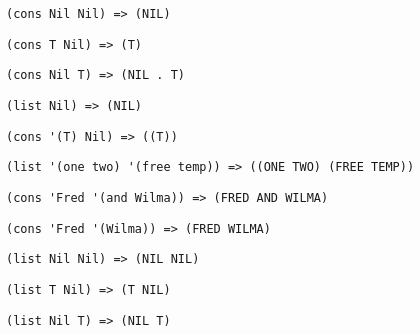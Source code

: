 \problem \hfill

\begin{lstlisting}
(cons Nil Nil) => (NIL)
\end{lstlisting}


\problem \hfill

\begin{lstlisting}
(cons T Nil) => (T)
\end{lstlisting}


\problem \hfill

\begin{lstlisting}
(cons Nil T) => (NIL . T)
\end{lstlisting}


\problem \hfill

\begin{lstlisting}
(list Nil) => (NIL)
\end{lstlisting}


\problem \hfill

\begin{lstlisting}
(cons '(T) Nil) => ((T))
\end{lstlisting}


\problem \hfill

\begin{lstlisting}
(list '(one two) '(free temp)) => ((ONE TWO) (FREE TEMP))
\end{lstlisting}


\problem \hfill

\begin{lstlisting}
(cons 'Fred '(and Wilma)) => (FRED AND WILMA)
\end{lstlisting}


\problem \hfill

\begin{lstlisting}
(cons 'Fred '(Wilma)) => (FRED WILMA)
\end{lstlisting}


\problem \hfill

\begin{lstlisting}
(list Nil Nil) => (NIL NIL)
\end{lstlisting}


\problem \hfill

\begin{lstlisting}
(list T Nil) => (T NIL)
\end{lstlisting}


\problem \hfill

\begin{lstlisting}
(list Nil T) => (NIL T)
\end{lstlisting}


